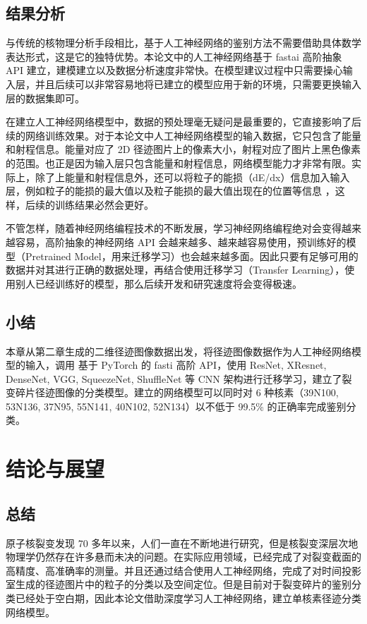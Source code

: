 \documentclass[AutoFakeBold]{LZUThesis}
\begin{document}
\section{结果分析}
与传统的核物理分析手段相比，基于人工神经网络的鉴别方法不需要借助具体数学表达形式，这是它的独特优势。本论文中的人工神经网络基于 fastai 高阶抽象 API 建立，建模建立以及数据分析速度非常快。在模型建议过程中只需要操心输入层，并且后续可以非常容易地将已建立的模型应用于新的环境，只需要更换输入层的数据集即可。

在建立人工神经网络模型中，数据的预处理毫无疑问是最重要的，它直接影响了后续的网络训练效果。对于本论文中人工神经网络模型的输入数据，它只包含了能量和射程信息。能量对应了 2D 径迹图片上的像素大小，射程对应了图片上黑色像素的范围。也正是因为输入层只包含能量和射程信息，网络模型能力才非常有限。实际上，除了上能量和射程信息外，还可以将粒子的能损（dE/dx）信息加入输入层，例如粒子的能损的最大值以及粒子能损的最大值出现在的位置等信息 \cite{闫洋洋2018用于高精度裂变截面测量的时间投影室}，这样，后续的训练结果必然会更好。

不管怎样，随着神经网络编程技术的不断发展，学习神经网络编程绝对会变得越来越容易，高阶抽象的神经网络 API 会越来越多、越来越容易使用，预训练好的模型（Pretrained Model，用来迁移学习）也会越来越多面。因此只要有足够可用的数据并对其进行正确的数据处理，再结合使用迁移学习（Transfer Learning），使用别人已经训练好的模型，那么后续开发和研究速度将会变得极速。



\section{小结}
本章从第二章生成的二维径迹图像数据出发，将径迹图像数据作为人工神经网络模型的输入，调用 基于 PyTorch 的 fasti 高阶 API，使用 ResNet, XResnet, DenseNet, VGG, SqueezeNet, ShuffleNet 等 CNN 架构进行迁移学习，建立了裂变碎片径迹图像的分类模型。建立的网络模型可以同时对 6 种核素（39N100, 53N136, 37N95, 55N141, 40N102, 52N134）以不低于 99.5\% 的正确率完成鉴别分类。








\chapter{结论与展望}
\section{总结}
原子核裂变发现 70 多年以来，人们一直在不断地进行研究，但是核裂变深层次地物理学仍然存在许多悬而未决的问题。在实际应用领域，已经完成了对裂变截面的高精度、高准确率的测量。并且还通过结合使用人工神经网络，完成了对时间投影室生成的径迹图片中的粒子的分类以及空间定位。但是目前对于裂变碎片的鉴别分类已经处于空白期，因此本论文借助深度学习人工神经网络，建立单核素径迹分类网络模型。
\end{document}
